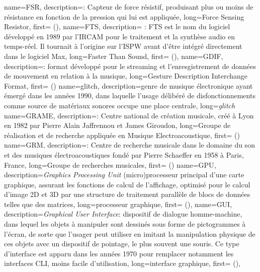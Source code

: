 {
    name={FSR},
    description={\textit{}: Capteur de force résistif, produisant plus ou moins de résistance en fonction de la pression qui lui est appliquée},
    long={Force Sensing Resistor},
    first={ ()},
}
{
    name={FTS},
    description={\textit{} : FTS est le nom du logiciel développé en 1989 par l'IRCAM pour le traitement et la synthèse audio en temps-réel. Il tournait à l'origine sur l'\gls{ISPW} avant d'être intégré directement dans le logiciel Max},
    long={Faster Than Sound},
    first={} (),
}
{
    name={GDIF},
    description={\textit{}: format développé pour le streaming et l'enresgistrement de données de mouvement en relation à la musique},
    long={Gesture Description Interchange Format},
    first={} ()
}
{
    name={glitch},
    description={genre de musique électronique ayant émergé dans les années 1990, dans laquelle l'usage délibéré de disfonctionnements comme source de matériaux sonores occupe une place centrale},
    long={\textit{glitch}}
}
{
    name={GRAME},
    description={\textit{}: Centre national de création musicale, créé à Lyon en 1982 par Pierre Alain Jaffrennou et James Giroudon},
    long={Groupe de réalisation et de recherche appliquée en Musique Electroacoustique},
    first={} ()
}
{
    name={GRM},
    description={\textit{}: Centre de recherche musicale dans le domaine du son et des musiques électroacoustiques fondé par Pierre Schaeffer en 1958 à Paris, France},
    long={Groupe de recherches musicales},
    first={} ()
}
{
    name={GPU},
    description={\textit{Graphics Processing Unit} (micro)processeur principal d'une carte graphique, assurant les fonctions de calcul de l'affichage, optimisé pour le calcul d'image 2D et 3D par une structure de traitement parallèle de blocs de données telles que des matrices},
    long={processeur graphique},
    first={} (),
}
{
    name={GUI},
    description={\textit{Graphical User Interface}: dispositif de dialogue homme-machine, dans lequel les objets à manipuler sont dessinés sous forme de pictogrammes à l'écran, de sorte que l'usager peut utiliser en imitant la manipulation physique de ces objets avec un dispositif de pointage, le plus souvent une souris. Ce type d'interface est apparu dans les années 1970 pour remplacer notamment les interfaces \gls{CLI}, moins facile d'utilisation},
    long={interface graphique},
    first={} (),
}
